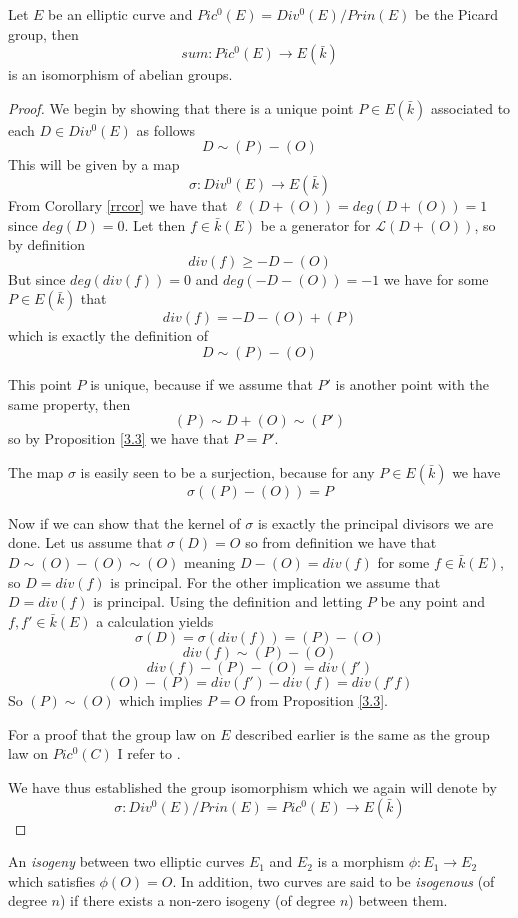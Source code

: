 \begin{thm} \label{isoteorem}
Let $E$ be an elliptic curve and $Pic^0(E) = Div^0(E)/Prin(E)$ be the Picard group, then
 $$ sum: Pic^0(E) \rightarrow E(\bar{k}) $$
is an isomorphism of abelian groups.
\end{thm}
\begin{proof}
 We begin by showing that there is a unique point $P \in E(\bar{k})$ associated to
each $D \in Div^0(E)$ as follows
$$ D \sim (P) -(O) $$
This will be given by a map
$$ \sigma: Div^0(E) \rightarrow E(\bar{k}) $$
From Corollary \ref{rrcor} we have that $\ell(D+(O)) = deg(D+(O)) = 1$ since $deg(D) = 0$.
Let then $f \in \bar{k}(E)$ be a generator for $\mathscr{L}(D+(O))$, so by definition
$$ div(f) \geq -D-(O) $$
But since $deg(div(f)) = 0$ and $deg(-D-(O)) = -1$ we have for some $P \in E(\bar{k})$ that
$$ div(f) = -D-(O)+(P) $$
which is exactly the definition of
$$ D \sim (P) - (O) $$

This point $P$ is unique, because if we assume that $P'$ is another point with the same
property, then
$$ (P) \sim D + (O) \sim (P') $$
so by Proposition \ref{3.3} we have that $ P = P'$.

The map $\sigma$ is easily seen to be a surjection, because for any $P \in E(\bar{k})$ we have
$$ \sigma((P)-(O)) = P $$

Now if we can show that the kernel of $\sigma$ is exactly the principal divisors we are done.
Let us assume that $\sigma(D) = O$ so from definition we have that $D \sim (O)-(O) \sim (O)$
meaning $D - (O) = div(f)$ for some $f \in \bar{k}(E)$, so $D = div(f)$ is principal.
For the other implication we assume that $D = div(f)$ is principal. Using the definition and
letting $P$ be any point and $f, f' \in \bar{k}(E)$ a calculation yields
$$ \sigma(D) = \sigma(div(f)) = (P)-(O) $$
$$ div(f) \sim (P) - (O) $$
$$ div(f) - (P) - (O) = div(f') $$
$$ (O) - (P) = div(f') - div(f) = div(f' f) $$
So $ (P) \sim (O) $ which implies $P = O$ from Proposition \ref{3.3}.

For a proof that the group law on $E$ described earlier is the same as the group law on $Pic^0(C)$ I refer
to \cite{AEC}.

We have thus established the group isomorphism which we again will denote by
$$ \sigma : Div^0(E)/Prin(E) = Pic^0(E) \rightarrow E(\bar{k}) $$
\end{proof}

\begin{mydef}
 An \emph{isogeny} between two elliptic curves $E_1$ and $E_2$ is a morphism $\phi: E_1 \rightarrow E_2$
which satisfies $\phi(O) = O$. In addition, two curves are said to be \emph{isogenous} (of degree $n$) 
if there exists a non-zero isogeny (of degree $n$) between them.
\end{mydef}

